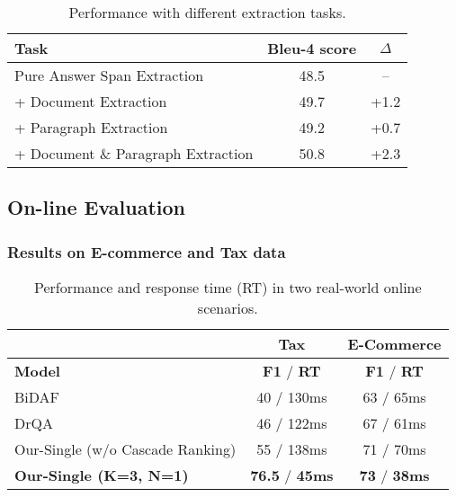 \documentclass[letterpaper]{article} \usepackage{aaai19}  \usepackage{graphicx}
\begin{document}
\begin{table}[t]
    \scriptsize
    \centering
    \caption{\label{tab:5} Performance with different extraction tasks.}
\begin{tabular}{lcc}
    \hline
       \textbf{Task} & \textbf{Bleu-4 score}  & \textbf{$\Delta$} \\
    \hline
    	Pure Answer Span Extraction & 48.5 & -- \\
	+ Document Extraction & 49.7 & +1.2 \\
	+ Paragraph Extraction & 49.2 & +0.7 \\
	+ Document \& Paragraph Extraction & 50.8 & +2.3 \\
    \hline
    \end{tabular} \vspace{-3mm}
    \end{table}



\subsection{On-line Evaluation}




\subsubsection{Results on E-commerce and Tax data}

\begin{table}[t]
\scriptsize
\centering
\caption{\label{tab:6} Performance and response time (RT) in two real-world online scenarios.}
\begin{tabular}{lcc}
\hline
        & \textbf{Tax} & \textbf{E-Commerce} \\
\hline
    \textbf{Model} & \textbf{F1} / \textbf{RT} & \textbf{F1} / \textbf{RT} \\
\hline
    BiDAF \cite{joshi2017triviaqa} & 40 / 130ms &  63 / 65ms \\
    DrQA \cite{chen2017reading} & 46 / 122ms & 67 / 61ms \\
    Our-Single (w/o Cascade Ranking) & 55 / 138ms &  71 / 70ms \\
    \textbf{Our-Single (K=3, N=1)} & \textbf{76.5} / \textbf{45ms} &  \textbf{73} / \textbf{38ms} \\
\hline
\end{tabular} \vspace{-3mm}
\end{table} 
\end{document}
